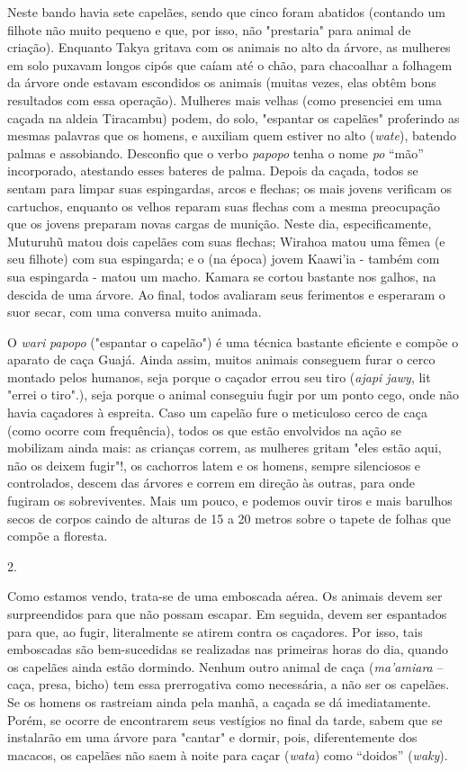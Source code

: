 Neste bando havia sete capelães, sendo que cinco foram abatidos
(contando um filhote não muito pequeno e que, por isso, não "prestaria"
para animal de criação). Enquanto Takya gritava com os animais no alto
da árvore, as mulheres em solo puxavam longos cipós que caíam até o
chão, para chacoalhar a folhagem da árvore onde estavam escondidos os
animais (muitas vezes, elas obtêm bons resultados com essa operação).
Mulheres mais velhas (como presenciei em uma caçada na aldeia Tiracambu)
podem, do solo, "espantar os capelães" proferindo as mesmas palavras que
os homens, e auxiliam quem estiver no alto (\emph{wate}), batendo palmas
e assobiando. Desconfio que o verbo \emph{papopo} tenha o nome \emph{po}
``mão'' incorporado, atestando esses bateres de palma. Depois da caçada,
todos se sentam para limpar suas espingardas, arcos e flechas; os mais
jovens verificam os cartuchos, enquanto os velhos reparam suas flechas
com a mesma preocupação que os jovens preparam novas cargas de munição.
Neste dia, especificamente, Muturuhũ matou dois capelães com suas
flechas; Wirahoa matou uma fêmea (e seu filhote) com sua espingarda; e o
(na época) jovem Kaawi'ia - também com sua espingarda - matou um macho.
Kamara se cortou bastante nos galhos, na descida de uma árvore. Ao
final, todos avaliaram seus ferimentos e esperaram o suor secar, com uma
conversa muito animada.

O \emph{wari} \emph{papopo} ("espantar o capelão") é uma técnica
bastante eficiente e compõe o aparato de caça Guajá. Ainda assim, muitos
animais conseguem furar o cerco montado pelos humanos, seja porque o
caçador errou seu tiro (\emph{ajapi jawy}, lit "errei o tiro".), seja
porque o animal conseguiu fugir por um ponto cego, onde não havia
caçadores à espreita. Caso um capelão fure o meticuloso cerco de caça
(como ocorre com frequência), todos os que estão envolvidos na ação se
mobilizam ainda mais: as crianças correm, as mulheres gritam "eles estão
aqui, não os deixem fugir"!, os cachorros latem e os homens, sempre
silenciosos e controlados, descem das árvores e correm em direção às
outras, para onde fugiram os sobreviventes. Mais um pouco, e podemos
ouvir tiros e mais barulhos secos de corpos caindo de alturas de 15 a 20
metros sobre o tapete de folhas que compõe a floresta.

2.

Como estamos vendo, trata-se de uma emboscada aérea. Os animais devem
ser surpreendidos para que não possam escapar. Em seguida, devem ser
espantados para que, ao fugir, literalmente se atirem contra os
caçadores. Por isso, tais emboscadas são bem-sucedidas se realizadas nas
primeiras horas do dia, quando os capelães ainda estão dormindo. Nenhum
outro animal de caça (\emph{ma'amiara} -- caça, presa, bicho) tem essa
prerrogativa como necessária, a não ser os capelães. Se os homens os
rastreiam ainda pela manhã, a caçada se dá imediatamente. Porém, se
ocorre de encontrarem seus vestígios no final da tarde, sabem que se
instalarão em uma árvore para "cantar" e dormir, pois, diferentemente
dos macacos, os capelães não saem à noite para caçar (\emph{wata}) como
``doidos'' (\emph{waky}).

